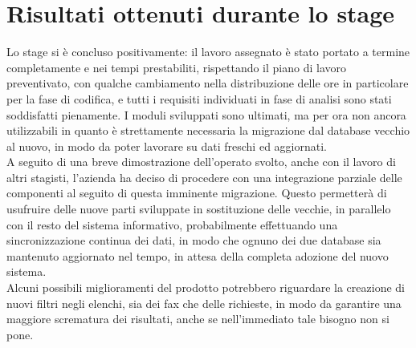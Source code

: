 \section{Risultati ottenuti durante lo stage}
Lo stage si \`e concluso positivamente: il lavoro assegnato \`e stato portato a termine completamente e nei tempi prestabiliti, rispettando il piano di lavoro preventivato, con qualche cambiamento nella distribuzione delle ore in particolare per la fase di codifica, e tutti i requisiti individuati in fase di analisi sono stati soddisfatti pienamente. 
I moduli sviluppati sono ultimati, ma per ora non ancora utilizzabili in quanto \`e strettamente necessaria la migrazione dal database vecchio al nuovo, in modo da poter lavorare su dati freschi ed aggiornati. \\
A seguito di una breve dimostrazione dell'operato svolto, anche con il lavoro di altri stagisti, l'azienda ha deciso di procedere con una integrazione parziale delle componenti al seguito di questa imminente migrazione. Questo permetter\`a di usufruire delle nuove parti sviluppate in sostituzione delle vecchie, in parallelo con il resto del sistema informativo, probabilmente effettuando una sincronizzazione continua dei dati, in modo che ognuno dei due database sia mantenuto aggiornato nel tempo, in attesa della completa adozione del nuovo sistema. \\
Alcuni possibili miglioramenti del prodotto potrebbero riguardare la creazione di nuovi filtri negli elenchi, sia dei fax che delle richieste, in modo da garantire una maggiore scrematura dei risultati, anche se nell'immediato tale bisogno non si pone.

